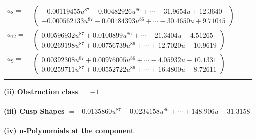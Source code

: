 \documentclass[1p]{elsarticle_modified}
\theoremstyle{definition}
\begin{document}
\begin{tabular}{m{7pt} m{180pt} m{7pt} m{180pt} }
\flushright $a_{8}=$&$\begin{pmatrix}-0.00119455 u^{87}-0.00482926 u^{86}+\cdots-31.9654 u+12.3640\\-0.000562133 u^{87}-0.00184393 u^{86}+\cdots-30.4650 u+9.71045\end{pmatrix}$ \\
\flushright $a_{12}=$&$\begin{pmatrix}0.00596932 u^{87}+0.0100899 u^{86}+\cdots-21.3404 u-4.51265\\0.00269198 u^{87}+0.00756739 u^{86}+\cdots+12.7020 u-10.9619\end{pmatrix}$ \\
\flushright $a_{9}=$&$\begin{pmatrix}0.00392308 u^{87}+0.00976005 u^{86}+\cdots-4.05932 u-10.1331\\0.00259711 u^{87}+0.00552722 u^{86}+\cdots+16.4800 u-8.72611\end{pmatrix}$\\&\end{tabular}
\flushleft \textbf{(ii) Obstruction class $= -1$}\\~\\
\flushleft \textbf{(iii) Cusp Shapes $= -0.0135860 u^{87}-0.0234158 u^{86}+\cdots+148.906 u-31.3158$}\\~\\
\newpage\renewcommand{\arraystretch}{1}
\flushleft \textbf{(iv) u-Polynomials at the component}\newline \\
\end{document}
